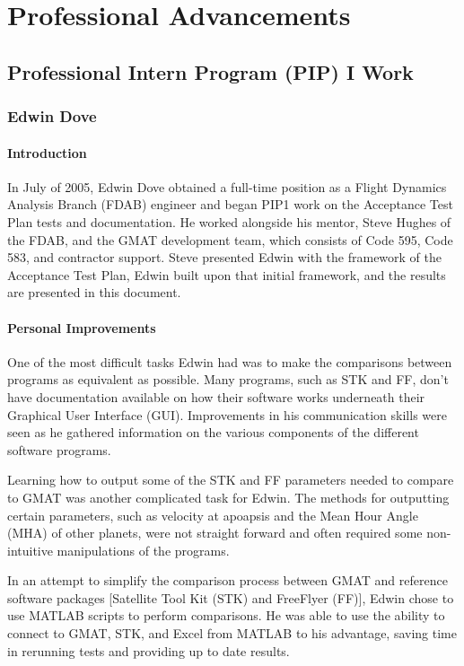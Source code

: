 \chapter{Professional Advancements}
\label{Ch:ProfAdvances}

\section{Professional Intern Program (PIP) I Work}

\subsection{Edwin Dove}
\subsubsection{Introduction}
In July of 2005, Edwin Dove obtained a full-time position as a
Flight Dynamics Analysis Branch (FDAB) engineer and began PIP1 work
on the Acceptance Test Plan tests and documentation. He worked
alongside his mentor, Steve Hughes of the FDAB, and the GMAT
development team, which consists of Code 595, Code 583, and
contractor support. Steve presented Edwin with the framework of the
Acceptance Test Plan, Edwin built upon that initial framework, and
the results are presented in this document.

\subsubsection{Personal Improvements}
One of the most difficult tasks Edwin had was to make the
comparisons between programs as equivalent as possible. Many
programs, such as STK and FF, don't have documentation available on
how their software works underneath their Graphical User Interface
(GUI). Improvements in his communication skills were seen as he
gathered information on the various components of the different
software programs.

Learning how to output some of the STK and FF parameters needed to
compare to GMAT was another complicated task for Edwin. The methods
for outputting certain parameters, such as velocity at apoapsis and
the Mean Hour Angle (MHA) of other planets, were not straight
forward and often required some non-intuitive manipulations of the
programs.

In an attempt to simplify the comparison process between GMAT and
reference software packages [Satellite Tool Kit (STK) and FreeFlyer
(FF)], Edwin chose to use MATLAB scripts to perform comparisons. He
was able to use the ability to connect to GMAT, STK, and Excel from
MATLAB to his advantage, saving time in rerunning tests and
providing up to date results.

